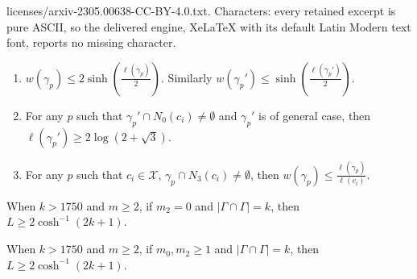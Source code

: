 \documentclass[10pt,a4paper]{amsart}
\newcommand{\abs}[1]{\left| #1 \right|}
\newcommand{\bracket}[1]{\left( #1 \right)}
\newcommand{\calx}{\mathcal{X}}
\begin{document}
licenses/arxiv-2305.00638-CC-BY-4.0.txt. Characters: every retained excerpt is pure ASCII, so the delivered engine, XeLaTeX with its default Latin Modern text font, reports no missing character.
\begin{lemma}\label{lemma_32}

\begin{enumerate}
\item
   $w(\gamma_p)\leqslant 2\sinh\bracket{\frac{\ell(\gamma_p)}2}$. Similarly $w(\gamma_p')\leqslant \sinh\bracket{\frac{\ell(\gamma_p')}2}$.

\item
   For any $p$ such that $\gamma_p'\cap N_0(c_i)\neq\emptyset$ and $\gamma_p'$ is of general case, then $\ell(\gamma_p')\geqslant2\log(2+\sqrt3)$.

\item
For any $p$ such that $c_i\in\calx$, $\gamma_p\cap N_3(c_i)\neq\emptyset$, then $w(\gamma_p)\leqslant\frac{\ell(\gamma_p)}{\ell(c_i)}$.
\end{enumerate}
\end{lemma}

\begin{thm}\label{m_bigger2_01} 
 When $k>1750$ and $m\geqslant2$, if $m_2=0$ and $\abs{\Gamma\cap\Gamma}=k$, then $L\geqslant2\cosh^{-1}(2k+1)$. 
\end{thm}

\begin{thm}\label{m_bigger2_03} 
 When $k>1750$ and $m\geqslant2$, if $m_0,m_2\geqslant1$ and $\abs{\Gamma\cap\Gamma}=k$, then $L\geqslant2\cosh^{-1}(2k+1)$. 
\end{thm}
\end{document}
